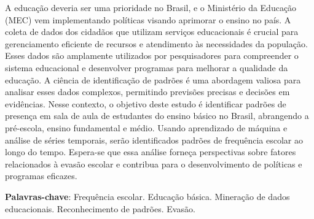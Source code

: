
\setlength{\absparsep}{18pt} %
\begin{resumo}
A educação deveria ser uma prioridade no Brasil, e o Ministério da Educação (MEC) %
vem implementando políticas visando aprimorar o ensino no país. A coleta de dados dos cidadãos que utilizam serviços educacionais é crucial para gerenciamento eficiente de recursos e atendimento às necessidades da população. Esses dados são amplamente utilizados por pesquisadores para compreender o sistema educacional e desenvolver programas para melhorar a qualidade da educação. A ciência de identificação de padrões é uma abordagem valiosa para analisar esses dados complexos, permitindo previsões precisas e decisões em evidências. Nesse contexto, o objetivo deste estudo é identificar padrões de presença em sala de aula de estudantes do ensino básico no Brasil, abrangendo a pré-escola, ensino fundamental e médio. Usando aprendizado de máquina e análise de séries temporais, serão identificados padrões de frequência escolar ao longo do tempo. Espera-se que essa análise forneça perspectivas sobre fatores relacionados à evasão escolar e contribua para o desenvolvimento de políticas e programas eficazes.


 \textbf{Palavras-chave}: Frequência escolar. Educação básica. Mineração de dados educacionais. Reconhecimento de padrões. Evasão.
\end{resumo}
